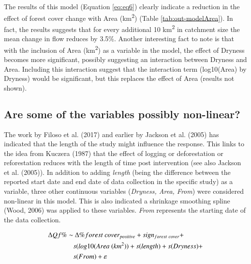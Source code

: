 \documentclass[]{elsarticle} %
\begin{document}
The results of this model (Equation \eqref{eq:eq6}) clearly indicate a reduction in the effect of forest cover change with Area (km\textsuperscript{2}) (Table \ref{tab:out-modelArea}). In fact, the results suggests that for every additional 10 km\textsuperscript{2} in catchment size the mean change in flow reduces by 3.5\%. Another interesting fact to note is that with the inclusion of Area (km\textsuperscript{2}) as a variable in the model, the effect of Dryness becomes more significant, possibly suggesting an interaction between Dryness and Area. Including this interaction suggest that the interaction term (log10(Area) by Dryness) would be significant, but this replaces the effect of Area (results not shown).

\hypertarget{are-some-of-the-variables-possibly-non-linear}{%
\subsection{Are some of the variables possibly non-linear?}\label{are-some-of-the-variables-possibly-non-linear}}

The work by Filoso et al. (2017) and earlier by Jackson et al. (2005) has indicated that the length of the study might influence the response. This links to the idea from Kuczera (1987) that the effect of logging or deforestation or reforestation reduces with the length of time post intervention (see also Jackson et al. (2005)). In addition to adding \emph{length} (being the difference between the reported start date and end date of data collection in the specific study) as a variable, three other continuous variables (\emph{Dryness, Area, From}) were considered non-linear in this model. This is also indicated a shrinkage smoothing spline (Wood, 2006) was applied to these variables. \emph{From} represents the starting date of the data collection.

\begin{align}
\Delta Qf \% \sim &~ \Delta \% forest~cover_{positive} + sign_{forest~cover} + \notag \\ & s(log10(Area ~(km^2)) + s(length) + s(Dryness) + \\ & s(From) + \varepsilon \label{eq:eq7}
\end{align}
\end{document}
